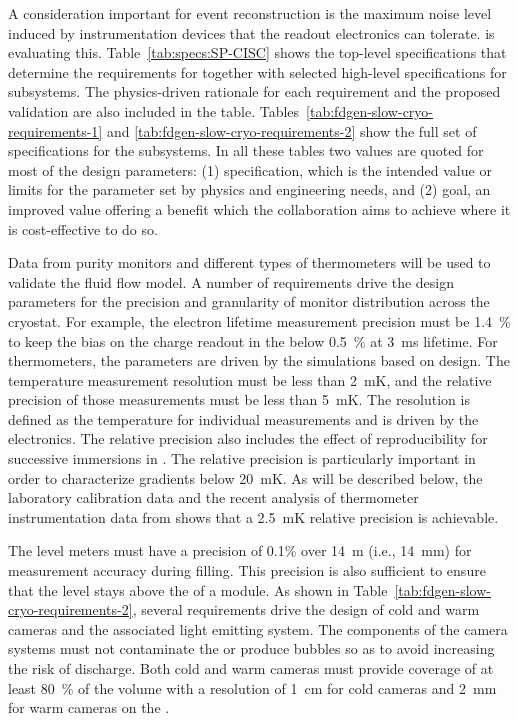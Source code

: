 A consideration important for event reconstruction is the maximum noise level induced by instrumentation devices that the readout electronics  can tolerate.  is evaluating this. 
Table~\ref{tab:specs:SP-CISC} shows the top-level specifications that determine the requirements for  together with selected high-level specifications for  subsystems. The physics-driven rationale for each requirement and the proposed validation are also included in the table.
Tables~\ref{tab:fdgen-slow-cryo-requirements-1} and \ref{tab:fdgen-slow-cryo-requirements-2} show the full set of specifications 
for the  subsystems. In all these tables two values are quoted for most of the design parameters: 
 (1) specification, which is the intended value or limits for the parameter set by physics and engineering needs, and (2) goal, an improved value offering a benefit which the collaboration aims to achieve where it is cost-effective to do so.


Data from purity monitors and different types of thermometers will be used to validate the  fluid flow model. 
A number of requirements drive the design parameters for the precision and granularity of monitor distribution across the cryostat. 
For example, the electron lifetime measurement precision must be \SI{1.4}{\%} to keep the bias on the charge readout in the  below \SI{0.5}{\%} at \SI{3}{ms} lifetime. For thermometers, the %
parameters are driven by the  simulations based on  design.
The temperature measurement resolution must be less than \SI{2}{mK}, and the relative precision of those measurements must be less than \SI{5}{mK}. The resolution is defined as the temperature   for individual measurements and is driven by the electronics. The relative precision also includes the effect of reproducibility for successive immersions in . 
The relative precision is particularly important in order to characterize %
gradients below \SI{20}{mK}. %
As will be described below, the laboratory calibration data and the recent analysis of thermometer instrumentation data from  shows that a \SI{2.5}{mK} relative precision is achievable. 

The level meters must have a precision of 0.1\% over \SI{14}{m} (i.e., \SI{14}{mm}) for measurement accuracy during filling. This precision is also sufficient to ensure that the  level stays above the  of a  module. As shown in Table~\ref{tab:fdgen-slow-cryo-requirements-2}, several requirements drive the design of cold and warm cameras and the associated light emitting system. The components of the camera systems must not contaminate the  or produce bubbles %
so as  to avoid  increasing the risk of  discharge. Both cold and warm cameras must provide coverage of at least \SI{80}{\%} of the  volume 
with a resolution of \SI{1}{cm} for cold cameras and \SI{2}{mm} for warm cameras on the .

